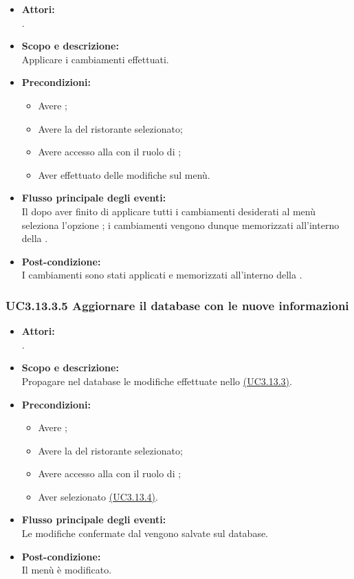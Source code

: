 \begin{itemize}
	\item \textbf{Attori:}
	\\.
	\item \textbf{Scopo e descrizione:} 
	\\Applicare i cambiamenti effettuati.
	\item \textbf{Precondizioni:}
	\begin{itemize}
		\item Avere ;
		\item Avere la  del ristorante selezionato;
		\item Avere accesso alla  con il ruolo di ;
		\item Aver effettuato delle modifiche sul menù.
	\end{itemize}
	\item \textbf{Flusso principale degli eventi:}
	\\Il {} dopo aver finito di applicare tutti i cambiamenti desiderati al menù seleziona l'opzione ; i cambiamenti vengono dunque memorizzati all'interno della .
	\item \textbf{Post-condizione:}
	\\I cambiamenti sono stati applicati e memorizzati all'interno della .
\end{itemize}

\subsubsection{UC3.13.3.5 Aggiornare il database con le nuove informazioni} \label{UC3.13.3.5}

\begin{itemize}
	\item \textbf{Attori:}
	\\.
	\item \textbf{Scopo e descrizione:} 
	\\Propagare nel database le modifiche effettuate nello \hyperref[UC3.13.3]{(UC3.13.3)}.
	\item \textbf{Precondizioni:}
	\begin{itemize}
		\item Avere ;
		\item Avere la  del ristorante selezionato;
		\item Avere accesso alla  con il ruolo di ;
		\item Aver selezionato  \hyperref[UC3.13.4]{(UC3.13.4)}.
	\end{itemize}
	\item \textbf{Flusso principale degli eventi:}
	\\Le modifiche confermate dal  vengono salvate sul database.
	\item \textbf{Post-condizione:}
	\\Il menù è modificato.
\end{itemize}


